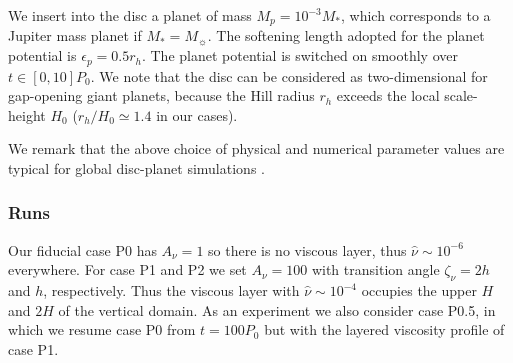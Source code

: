 We insert into the disc a planet of mass  
$M_p=10^{-3}M_*$, which corresponds to a Jupiter mass planet if
$M_*=M_{\sun}$. The softening length adopted for the planet potential is
$\epsilon_p=0.5r_h$. The planet potential is switched on 
smoothly over $t\in[0,10]P_0$. We note that the disc can be considered
as two-dimensional for gap-opening giant planets, because the Hill
radius $r_h$ exceeds the local scale-height $H_0$ ($r_h/H_0\simeq1.4$
in our cases).   

We remark that the above choice of physical and numerical parameter
values are typical for global disc-planet simulations
\citep[e.g.][]{valborro06,mignone12}.   



\subsubsection{Runs}

Our fiducial case P0 has $A_\nu=1$ so there is no viscous layer, thus
$\hat{\nu}\sim 10^{-6}$ everywhere. For case
P1 and P2 we set $A_\nu=100$ with transition angle $\zeta_\nu=2h$ and
$h$, respectively. Thus the viscous layer with $\hat{\nu}\sim10^{-4}$
occupies the upper $H$ and $2H$ of the vertical domain. As an
experiment we also consider case P0.5, in which we resume case P0 from
$t=100P_0$ but with the layered viscosity profile of case P1. 



